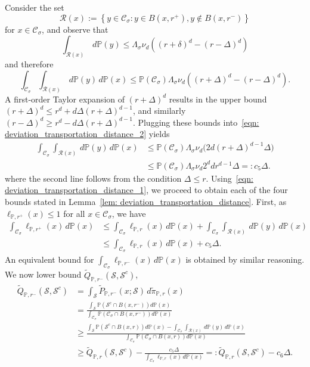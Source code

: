 \documentclass[11pt,twoside]{article}
\newcommand{\set}[1]{\left\{#1\right\}}
\newcommand{\1}{\mathbf{1}}
\newcommand{\Pbb}{\mathbb{P}}
\newcommand{\Sset}{\mathcal{S}}
\newcommand{\Cset}{\mathcal{C}}
\newcommand{\Csig}{\Cset_{\sigma}}
\begin{document}
Consider the set
\begin{equation*}
\mathcal{R}(x) := \set{y \in \Csig: y \in B(x,r^+), y \not\in B(x,r^-)}
\end{equation*} 
for $x \in \Csig$, and observe that
\begin{equation*}
\int_{\mathcal{R}(x)} \,d\Pbb(y) \leq \Lambda_{\sigma} \nu_d \left((r + \delta)^d - (r - \varDelta)^d\right)
\end{equation*}
and therefore
\begin{equation}
\label{eqn: deviation_transportation_distance_2}
\int_{\Csig} \int_{\mathcal{R}(x)} \,d\Pbb(y) \,d\Pbb(x) \leq \Pbb(\Csig )\Lambda_{\sigma} \nu_d \left((r + \varDelta)^d - (r - \varDelta)^d\right).
\end{equation}
A first-order Taylor expansion of $(r + \varDelta)^d$ results in the upper bound $(r + \varDelta)^d \leq r^d + d\varDelta(r + \varDelta)^{d - 1}$, and similarly $(r - \varDelta)^d \geq r^d - d\varDelta(r + \varDelta)^{d - 1}$. Plugging these bounds into~\eqref{eqn: deviation_transportation_distance_2} yields
\begin{align}
\int_{\Csig} \int_{\mathcal{R}(x)} \,d\Pbb(y) \,d\Pbb(x)  & \leq \Pbb(\Csig) \Lambda_{\sigma} \nu_d \bigl( 2d(r + \Delta)^{d - 1}\varDelta \bigr) \tag{1st-order Taylor expansion of $(r + \Delta)^d$ } \\
& \leq \Pbb(\Csig) \Lambda_{\sigma} \nu_d  2^{d}d r^{d-1}\varDelta =: c_5 \varDelta. \label{eqn: deviation_transportation_distance_1}
\end{align}
where the second line follows from the condition $\Delta \leq r$. Using~\eqref{eqn: deviation_transportation_distance_1}, we proceed to obtain each of the four bounds stated in Lemma~\ref{lem: deviation_transportation_distance}. First, as $\ell_{\Pbb,r^{+}}(x) \leq 1$ for all $x \in \Csig$, we have
\begin{align*}
\int_{\Csig} \ell_{\Pbb,r^+}(x) \,d\Pbb(x) & \leq \int_{\Csig} \ell_{\Pbb,r}(x) \,d\Pbb(x) + \int_{\Csig} \int_{\mathcal{R}(x)} \,d\Pbb(y) \,d\Pbb(x) \\
& \leq \int_{\Csig} \ell_{\Pbb,r}(x) \,d\Pbb(x) + c_5\varDelta.
\end{align*}
An equivalent bound for $\int_{\Csig} \ell_{\Pbb,r^-}(x) \,d\Pbb(x)$ is obtained by similar reasoning. We now lower bound $\widetilde{Q}_{\Pbb,r^{-}}(\Sset, \Sset^c)$,
\begin{align*}
\widetilde{Q}_{\Pbb,r^{-}}(\Sset, \Sset^c) & = \int_{\Sset} \widetilde{P}_{\Pbb,r^-}(x; \Sset) \,d\widetilde{\pi}_{\Pbb,r}(x) \\
& = \frac{\int_{\Sset} \Pbb(\Sset^c \cap B(x,r^-)) d\Pbb(x)}{\int_{\Csig} \Pbb(\Csig \cap B(x,r^-)) d\Pbb(x)} \\
& \geq \frac{\int_{\Sset} \Pbb(\Sset^c \cap B(x,r)) d\Pbb(x) - \int_{\Csig} \int_{\mathcal{R}(x)} \,d\Pbb(y) \,d\Pbb(x)}{\int_{\Csig} \Pbb(\Csig \cap B(x,r)) d\Pbb(x)} \\
& \geq \widetilde{Q}_{\Pbb,r}(\Sset, \Sset^c) - \frac{c_5 \varDelta}{\int_{\Csig}\ell_{\Pbb,r}(x) \,d\Pbb(x)} =:\widetilde{Q}_{\Pbb,r}(\Sset, \Sset^c) - c_6 \varDelta.
\end{align*}
\end{document}
